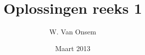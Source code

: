 \documentclass{article}
\title{Oplossingen reeks 1}
\author{W. Van Onsem}
\date{Maart 2013}
\begin{document}
\maketitle
\begin{question}

\end{question}
\end{document}
